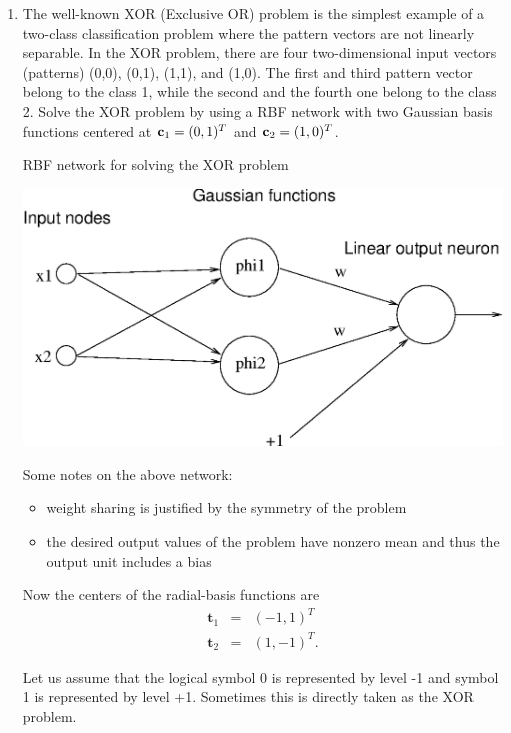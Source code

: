 \begin{enumerate}
\begin{solution}
  \end{solution}
  

\item The well-known XOR (Exclusive OR) problem is the simplest example of a
  two-class classification problem where the pattern vectors are not linearly
  separable. In the XOR problem, there are four two-dimensional input vectors
  (patterns) (0,0), (0,1), (1,1), and (1,0). The first and third pattern
  vector belong to the class 1, while the second and the fourth one belong
  to the class 2. Solve the XOR problem by using a RBF network with two
  Gaussian basis functions centered at ${\bf c}_1 = (0,1)^T$ and
  ${\bf c}_2 = (1,0)^T$.

  \begin{solution}

    RBF network for solving the XOR problem

    \begin{center}
      \includegraphics[scale=0.7]{v102-f1.eps}
    \end{center}

    Some notes on the above network:
    \begin{itemize}
    \item weight sharing is justified by the symmetry of the problem
    \item the desired output values of the problem have nonzero mean and
      thus the output unit includes a bias 
    \end{itemize}
    Now the centers of the radial-basis functions are
    \begin{eqnarray*}
      \mathbf{t}_1&=&(-1,1)^T\\
      \mathbf{t}_2&=&(1,-1)^T.
    \end{eqnarray*}

    Let us assume that the logical symbol 0 is represented by level -1
    and symbol 1 is represented by level +1. Sometimes this is directly
    taken as the XOR problem.


\end{solution}
\end{enumerate}
